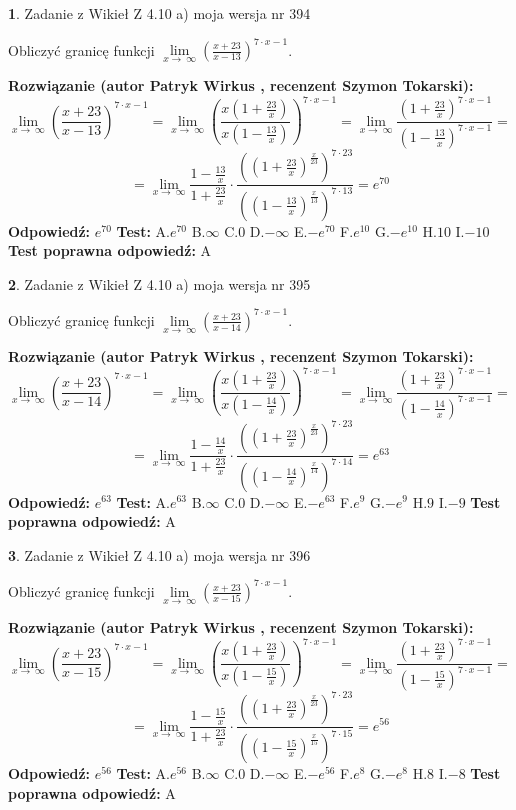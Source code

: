 \documentclass[12pt, a4paper]{article}
\theoremstyle{definition} %
\newtheorem{zad}{}
\newcommand{\zadStart}[1]{\begin{zad}#1\newline}
\newcommand{\zadStop}{\end{zad}}
\newcommand{\rozwStart}[2]{\noindent \textbf{Rozwiązanie (autor #1 , recenzent #2): }\newline}
\newcommand{\rozwStop}{\newline}
\newcommand{\odpStart}{\noindent \textbf{Odpowiedź:}\newline}
\newcommand{\odpStop}{\newline}
\newcommand{\testStart}{\noindent \textbf{Test:}\newline}
\newcommand{\testStop}{\newline}
\newcommand{\kluczStart}{\noindent \textbf{Test poprawna odpowiedź:}\newline}
\newcommand{\kluczStop}{\newline}
\begin{document}
\zadStart{Zadanie z Wikieł Z 4.10 a) moja wersja nr 394}

Obliczyć granicę funkcji  $\lim\limits_{x\to\ \infty}(\frac{x+23}{x-13})^{7\cdot x-1}$.
\zadStop
\rozwStart{Patryk Wirkus}{Szymon Tokarski}
$$\lim\limits_{x\to\ \infty}(\frac{x+23}{x-13})^{7\cdot x-1} = \lim\limits_{x\to\ \infty}(\frac{x(1+\frac{23}{x})}{x(1-\frac{13}{x})})^{7\cdot x-1}=\lim\limits_{x\to\ \infty}\frac{(1+\frac{23}{x})^{7\cdot x-1}}{(1-\frac{13}{x})^{7\cdot x-1}}=$$
$$=\lim\limits_{x\to\ \infty}\frac{1-\frac{13}{x}}{1+\frac{23}{x}}\cdot\frac{((1+\frac{23}{x})^{\frac{x}{23}})^{7\cdot23}}{((1-\frac{13}{x})^{\frac{x}{13}})^{7\cdot13}}=e^{70}$$
\rozwStop
\odpStart
$e^{70}$
\odpStop
\testStart
A.$e^{70}$ B.$\infty$ C.$0$ D.$-\infty$ E.$-e^{70}$
F.$e^{10}$ G.$-e^{10}$
H.$10$
I.$-10$
\testStop
\kluczStart
A
\kluczStop



\zadStart{Zadanie z Wikieł Z 4.10 a) moja wersja nr 395}

Obliczyć granicę funkcji  $\lim\limits_{x\to\ \infty}(\frac{x+23}{x-14})^{7\cdot x-1}$.
\zadStop
\rozwStart{Patryk Wirkus}{Szymon Tokarski}
$$\lim\limits_{x\to\ \infty}(\frac{x+23}{x-14})^{7\cdot x-1} = \lim\limits_{x\to\ \infty}(\frac{x(1+\frac{23}{x})}{x(1-\frac{14}{x})})^{7\cdot x-1}=\lim\limits_{x\to\ \infty}\frac{(1+\frac{23}{x})^{7\cdot x-1}}{(1-\frac{14}{x})^{7\cdot x-1}}=$$
$$=\lim\limits_{x\to\ \infty}\frac{1-\frac{14}{x}}{1+\frac{23}{x}}\cdot\frac{((1+\frac{23}{x})^{\frac{x}{23}})^{7\cdot23}}{((1-\frac{14}{x})^{\frac{x}{14}})^{7\cdot14}}=e^{63}$$
\rozwStop
\odpStart
$e^{63}$
\odpStop
\testStart
A.$e^{63}$ B.$\infty$ C.$0$ D.$-\infty$ E.$-e^{63}$
F.$e^{9}$ G.$-e^{9}$
H.$9$
I.$-9$
\testStop
\kluczStart
A
\kluczStop



\zadStart{Zadanie z Wikieł Z 4.10 a) moja wersja nr 396}

Obliczyć granicę funkcji  $\lim\limits_{x\to\ \infty}(\frac{x+23}{x-15})^{7\cdot x-1}$.
\zadStop
\rozwStart{Patryk Wirkus}{Szymon Tokarski}
$$\lim\limits_{x\to\ \infty}(\frac{x+23}{x-15})^{7\cdot x-1} = \lim\limits_{x\to\ \infty}(\frac{x(1+\frac{23}{x})}{x(1-\frac{15}{x})})^{7\cdot x-1}=\lim\limits_{x\to\ \infty}\frac{(1+\frac{23}{x})^{7\cdot x-1}}{(1-\frac{15}{x})^{7\cdot x-1}}=$$
$$=\lim\limits_{x\to\ \infty}\frac{1-\frac{15}{x}}{1+\frac{23}{x}}\cdot\frac{((1+\frac{23}{x})^{\frac{x}{23}})^{7\cdot23}}{((1-\frac{15}{x})^{\frac{x}{15}})^{7\cdot15}}=e^{56}$$
\rozwStop
\odpStart
$e^{56}$
\odpStop
\testStart
A.$e^{56}$ B.$\infty$ C.$0$ D.$-\infty$ E.$-e^{56}$
F.$e^{8}$ G.$-e^{8}$
H.$8$
I.$-8$
\testStop
\kluczStart
A
\kluczStop
\end{document}

